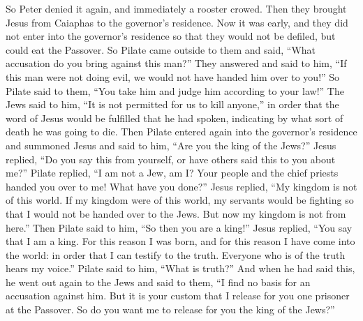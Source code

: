 \begin{biblechapter}
\verse So Peter denied it again, and immediately a rooster crowed.
 Then they brought Jesus from Caiaphas to the governor’s residence. Now it was early, and they did not enter into the governor’s residence so that they would not be defiled, but could eat the Passover.
\verse So Pilate came outside to them and said, “What accusation do you bring against this man?”
\verse They answered and said to him, “If this man were not doing evil, we would not have handed him over to you!”
\verse So Pilate said to them, “You take him and judge him according to your law!” The Jews said to him, “It is not permitted for us to kill anyone,”
\verse in order that the word of Jesus would be fulfilled that he had spoken, indicating by what sort of death he was going to die.
 Then Pilate entered again into the governor’s residence and summoned Jesus and said to him, “Are you the king of the Jews?”
\verse Jesus replied, “Do you say this from yourself, or have others said this to you about me?”
\verse Pilate replied, “I am not a Jew, am I? Your people and the chief priests handed you over to me! What have you done?”
\verse Jesus replied, “My kingdom is not of this world. If my kingdom were of this world, my servants would be fighting so that I would not be handed over to the Jews. But now my kingdom is not from here.”
\verse Then Pilate said to him, “So then you are a king!” Jesus replied, “You say that I am a king. For this reason I was born, and for this reason I have come into the world: in order that I can testify to the truth. Everyone who is of the truth hears my voice.”
\verse Pilate said to him, “What is truth?”
\verse And when he had said this, he went out again to the Jews and said to them, “I find no basis for an accusation against him.
\verse But it is your custom that I release for you one prisoner at the Passover. So do you want me to release for you the king of the Jews?”
\end{biblechapter}

